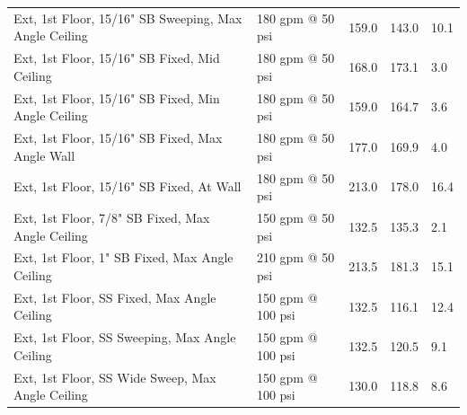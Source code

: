 \documentclass{book}
\begin{document}
\begin{table}[]
\begin{tabular}{lllll}
Ext, 1st Floor, 15/16" SB Sweeping, Max Angle Ceiling & 180 gpm @ 50 psi                    & 159.0                                  & 143.0                                   & 10.1                                    \\
Ext, 1st Floor, 15/16" SB Fixed, Mid Ceiling          & 180 gpm @ 50 psi                    & 168.0                                  & 173.1                                   & 3.0                                     \\
Ext, 1st Floor, 15/16" SB Fixed, Min Angle Ceiling    & 180 gpm @ 50 psi                    & 159.0                                  & 164.7                                   & 3.6                                     \\
Ext, 1st Floor, 15/16" SB Fixed, Max Angle Wall       & 180 gpm @ 50 psi                    & 177.0                                  & 169.9                                   & 4.0                                     \\
Ext, 1st Floor, 15/16" SB Fixed, At Wall              & 180 gpm @ 50 psi                    & 213.0                                  & 178.0                                   & 16.4                                    \\
Ext, 1st Floor, 7/8" SB Fixed, Max Angle Ceiling      & 150 gpm @ 50 psi                    & 132.5                                  & 135.3                                   & 2.1                                     \\
Ext, 1st Floor, 1" SB Fixed, Max Angle Ceiling        & 210 gpm @ 50 psi                    & 213.5                                  & 181.3                                   & 15.1                                    \\
Ext, 1st Floor, SS Fixed, Max Angle Ceiling           & 150 gpm @ 100 psi                   & 132.5                                  & 116.1                                   & 12.4                                    \\
Ext, 1st Floor, SS Sweeping, Max Angle Ceiling        & 150 gpm @ 100 psi                   & 132.5                                  & 120.5                                   & 9.1                                     \\
Ext, 1st Floor, SS Wide Sweep, Max Angle Ceiling      & 150 gpm @ 100 psi                   & 130.0                                  & 118.8                                   & 8.6                                     \\

\end{tabular}
\end{table}
\end{document}
